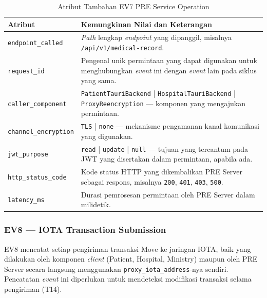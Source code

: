 \begin{table}[htbp]
\centering
\caption{Atribut Tambahan EV7 PRE Service Operation}
\label{tab:ev7-detail}
\renewcommand{\arraystretch}{1.3}
\begin{tabular}{|p{4cm}|p{7.5cm}|}
\hline
\textbf{Atribut} & \textbf{Kemungkinan Nilai dan Keterangan} \\
\hline
\texttt{endpoint\_called} &
\textit{Path} lengkap \textit{endpoint} yang dipanggil, misalnya
\texttt{/api/v1/medical-record}. \\
\hline
\texttt{request\_id} &
Pengenal unik permintaan yang dapat digunakan untuk menghubungkan
\textit{event} ini dengan \textit{event} lain pada siklus yang sama. \\
\hline
\texttt{caller\_component} &
\texttt{PatientTauriBackend} | \texttt{HospitalTauriBackend} |
\texttt{ProxyReencryption} --- komponen yang mengajukan permintaan. \\
\hline
\texttt{channel\_encryption} &
\texttt{TLS} | \texttt{none} --- mekanisme pengamanan kanal komunikasi
yang digunakan. \\
\hline
\texttt{jwt\_purpose} &
\texttt{read} | \texttt{update} | \texttt{null} --- tujuan yang tercantum
pada JWT yang disertakan dalam permintaan, apabila ada. \\
\hline
\texttt{http\_status\_code} &
Kode status HTTP yang dikembalikan PRE Server sebagai respons, misalnya
\texttt{200}, \texttt{401}, \texttt{403}, \texttt{500}. \\
\hline
\texttt{latency\_ms} &
Durasi pemrosesan permintaan oleh PRE Server dalam milidetik. \\
\hline
\end{tabular}
\end{table}

\subsubsection{EV8 --- IOTA Transaction Submission}
\label{subsec:ev8-iota-transaction}

EV8 mencatat setiap pengiriman transaksi Move ke jaringan IOTA, baik yang
dilakukan oleh komponen \textit{client} (Patient, Hospital, Ministry) maupun
oleh PRE Server secara langsung menggunakan \texttt{proxy\_iota\_address}-nya
sendiri. Pencatatan \textit{event} ini diperlukan untuk mendeteksi modifikasi
transaksi selama pengiriman (T14).

